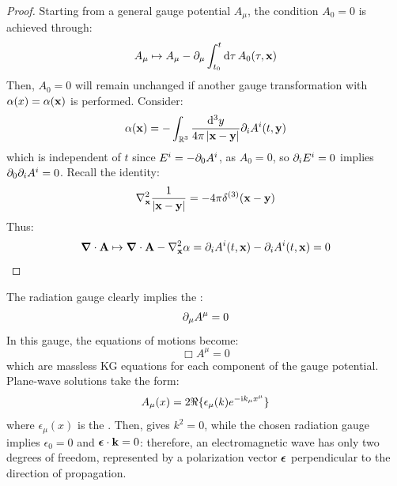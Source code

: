 \begin{proofbox}
  \begin{proof}
    Starting from a general gauge potential $ A_\mu $, the condition $ A_0 = 0 $ is achieved through:
    \begin{equation*}
      A_\mu \mapsto A_\mu - \partial_\mu \int_{t_0}^t \mathrm{d}\tau\, A_0(\tau,\mathbf{x})
    \end{equation*}
    Then, $ A_0 = 0 $ will remain unchanged if another gauge transformation with $ \alpha(x) = \alpha(\mathbf{x}) $ is performed. Consider:
    \begin{equation*}
      \alpha(\mathbf{x}) = - \int_{\mathbb{R}^3} \frac{\mathrm{d}^3y}{4\pi \left\lvert\mathbf{x} - \mathbf{y}\right\rvert} \partial_i A^i(t,\mathbf{y})
    \end{equation*}
    which is independent of $ t $ since $ E^i = -\partial_0 A^i $, as $ A_0 = 0 $, so $ \partial_i E^i = 0 $ implies $ \partial_0 \partial_i A^i = 0 $. Recall the identity:
    \begin{equation}
      \nabla^2_{\mathbf{x}} \frac{1}{\left\lvert\mathbf{x} - \mathbf{y}\right\rvert} = - 4\pi \delta^{(3)}(\mathbf{x} - \mathbf{y})
    \end{equation}
    Thus:
    \begin{equation*}
      \boldsymbol{\nabla} \cdot \mathbf{A} \mapsto \boldsymbol{\nabla} \cdot \mathbf{A} - \nabla^2_{\mathbf{x}} \alpha = \partial_i A^i(t,\mathbf{x}) - \partial_i A^i(t,\mathbf{x}) = 0
    \end{equation*}
  \end{proof}
\end{proofbox}

The radiation gauge clearly implies the :
\begin{equation}
  \partial_\mu A^\mu = 0
\end{equation}
In this gauge, the equations of motions  become:
\begin{equation}
  \Box A^\mu = 0
  \label{eq:maxw-lor}
\end{equation}
which are massless KG equations for each component of the gauge potential. Plane-wave solutions take the form:
\begin{equation}
  A_\mu(x) = 2\Re\{\epsilon_\mu(k) e^{-\mathrm{i} k_\mu x^\mu}\}
\end{equation}
where $ \epsilon_\mu(x) $ is the . Then,  gives $ k^2 = 0 $, while the chosen radiation gauge implies $ \epsilon_0 = 0 $ and $ \boldsymbol{\epsilon} \cdot \mathbf{k} = 0 $: therefore, an electromagnetic wave has only two degrees of freedom, represented by a polarization vector $ \boldsymbol{\epsilon} $ perpendicular to the direction of propagation.

